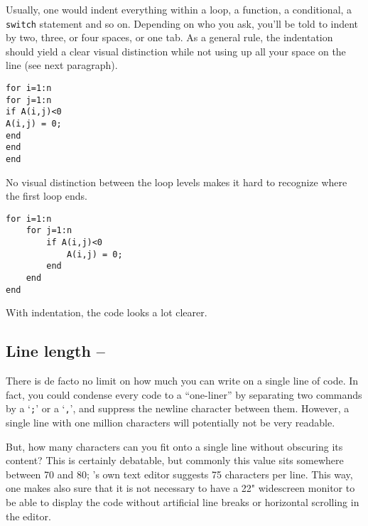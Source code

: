 Usually, one would indent everything within a loop, a function, a conditional, a \lstinline!switch! statement and so on. Depending on who you ask, you'll be told to indent by two, three, or four spaces, or one tab. As a general rule, the indentation should yield a clear visual distinction while not using up all your space on the line (see next paragraph).

\hfill
\begin{minipage}[t]{.45\textwidth}
\begin{lstlisting}[framerule=2pt,rulecolor=\color{badred}]
for i=1:n
for j=1:n
if A(i,j)<0
A(i,j) = 0;
end
end
end
\end{lstlisting}
No visual distinction between the loop levels makes it hard to recognize where the first loop ends.\footnotemark
\end{minipage}
\hfill
\begin{minipage}[t]{.45\textwidth}
\begin{lstlisting}[framerule=2pt,rulecolor=\color{goodgreen}]
for i=1:n
    for j=1:n
        if A(i,j)<0
            A(i,j) = 0;
        end
    end
end
\end{lstlisting}
With indentation, the code looks a lot clearer.\footnotemark[\value{footnote}]
\end{minipage}
\hfill






\subsection{Line length -- \cleansymbol}
There is de facto no limit on how much you can write on a single line of \matlab{} code. In fact, you could condense every \matlab{} code to a ``one-liner'' by separating two commands by a `\lstinline!;!' or a `\lstinline!,!', and suppress the newline character between them. However, a single line with one million characters will potentially not be very readable.

But, how many characters can you fit onto a single line without obscuring its content? This is certainly debatable, but commonly this value sits somewhere between 70 and 80; \matlab{}'s own text editor suggests 75 characters per line. This way, one makes also sure that it is not necessary to have a 22" widescreen monitor to be able to display the code without artificial line breaks or horizontal scrolling in the editor.

